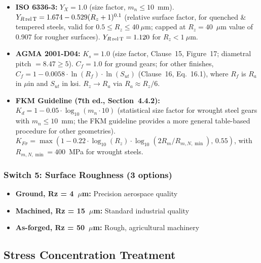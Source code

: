 \documentclass[12pt,a4paper]{article}
\begin{document}
\begin{itemize}
  \item \textbf{ISO 6336-3:} $Y_X = 1.0$ (size factor, $m_n \leq 10$~mm).
        $Y_{R\,\rm rel\,T} = 1.674 - 0.529(R_z+1)^{0.1}$ (relative
        surface factor, for quenched \& tempered steels, valid for
        $0.5 \leq R_z \leq 40~\mu$m; capped at $R_z=40$~$\mu$m value
        of 0.907 for rougher surfaces). $Y_{R\,\rm rel\,T} = 1.120$
        for $R_z < 1~\mu$m.
  \item \textbf{AGMA 2001-D04:} $K_s = 1.0$ (size factor, Clause~15,
        Figure~17; diametral pitch $=8.47 \geq 5$).
        $C_f = 1.0$ for ground gears; for other finishes,
        $C_f = 1 - 0.0058 \cdot \ln(R_f) \cdot \ln(S_{ut})$
        (Clause~16, Eq.~16.1), where $R_f$ is $R_a$ in $\mu$in
        and $S_{ut}$ in ksi. $R_z \rightarrow R_a$ via
        $R_a \approx R_z/6$.
  \item \textbf{FKM Guideline (7th ed., Section~4.4.2):}
        $K_d = 1 - 0.05 \cdot \log_{10}(m_n \cdot 10)$ (statistical size
        factor for wrought steel gears with $m_n \leq 10$~mm;
        the FKM guideline provides a more general table-based procedure
        for other geometries).
        $K_{F\sigma} = \max(1 - 0.22 \cdot \log_{10}(R_z) \cdot
        \log_{10}(2R_m/R_{m,N,\min}),\, 0.55)$, with
        $R_{m,N,\min}=400$~MPa for wrought steels.
\end{itemize}

\subsubsection{Switch 5: Surface Roughness (3 options)}

\begin{itemize}
  \item \textbf{Ground, Rz = 4~$\mu$m:} Precision aerospace quality
  \item \textbf{Machined, Rz = 15~$\mu$m:} Standard industrial quality
  \item \textbf{As-forged, Rz = 50~$\mu$m:} Rough, agricultural machinery
\end{itemize}

\subsection{Stress Concentration Treatment}
\label{sec:stress_concentration}
\end{document}
